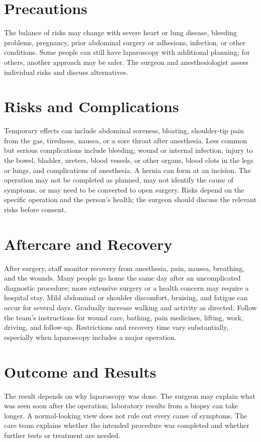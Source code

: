 \section*{Precautions}
The balance of risks may change with severe heart or lung disease, bleeding problems, pregnancy, prior abdominal surgery or adhesions, infection, or other conditions. Some people can still have laparoscopy with additional planning; for others, another approach may be safer. The surgeon and anesthesiologist assess individual risks and discuss alternatives.

\section*{Risks and Complications}
Temporary effects can include abdominal soreness, bloating, shoulder-tip pain from the gas, tiredness, nausea, or a sore throat after anesthesia. Less common but serious complications include bleeding, wound or internal infection, injury to the bowel, bladder, ureters, blood vessels, or other organs, blood clots in the legs or lungs, and complications of anesthesia. A hernia can form at an incision. The operation may not be completed as planned, may not identify the cause of symptoms, or may need to be converted to open surgery. Risks depend on the specific operation and the person's health; the surgeon should discuss the relevant risks before consent.

\section*{Aftercare and Recovery}
After surgery, staff monitor recovery from anesthesia, pain, nausea, breathing, and the wounds. Many people go home the same day after an uncomplicated diagnostic procedure; more extensive surgery or a health concern may require a hospital stay. Mild abdominal or shoulder discomfort, bruising, and fatigue can occur for several days. Gradually increase walking and activity as directed. Follow the team's instructions for wound care, bathing, pain medicines, lifting, work, driving, and follow-up. Restrictions and recovery time vary substantially, especially when laparoscopy includes a major operation.

\section*{Outcome and Results}
The result depends on why laparoscopy was done. The surgeon may explain what was seen soon after the operation; laboratory results from a biopsy can take longer. A normal-looking view does not rule out every cause of symptoms. The care team explains whether the intended procedure was completed and whether further tests or treatment are needed.

